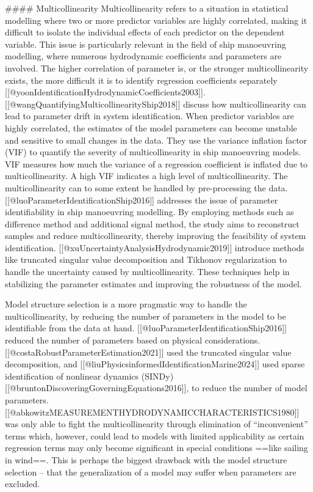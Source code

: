 #### Multicollinearity
Multicollinearity refers to a situation in statistical modelling where two or more predictor variables are highly correlated, making it difficult to isolate the individual effects of each predictor on the dependent variable. This issue is particularly relevant in the field of ship manoeuvring modelling, where numerous hydrodynamic coefficients and parameters are involved.
The higher correlation of parameter is, or the stronger multicollinearity exists, the more difficult it is to identify regression coefficients separately [[@yoonIdentificationHydrodynamicCoefficients2003]].
[[@wangQuantifyingMulticollinearityShip2018]] discuss how multicollinearity can lead to parameter drift in system identification. When predictor variables are highly correlated, the estimates of the model parameters can become unstable and sensitive to small changes in the data. They use the variance inflation factor (VIF) to quantify the severity of multicollinearity in ship manoeuvring models. VIF measures how much the variance of a regression coefficient is inflated due to multicollinearity. A high VIF indicates a high level of multicollinearity.
The multicollinearity can to some extent be handled by pre-processing the data.
[[@luoParameterIdentificationShip2016]] addresses the issue of parameter identifiability in ship manoeuvring modelling. By employing methods such as difference method and additional signal method, the study aims to reconstruct samples and reduce multicollinearity, thereby improving the feasibility of system identification.
[[@xuUncertaintyAnalysisHydrodynamic2019]] introduce methods like truncated singular value decomposition and Tikhonov regularization to handle the uncertainty caused by multicollinearity. These techniques help in stabilizing the parameter estimates and improving the robustness of the model.

Model structure selection is a more pragmatic way to handle the multicollinearity, by reducing the number of parameters in the model to be identifiable from the data at hand.  [[@luoParameterIdentificationShip2016]] reduced the number of parameters based on physical considerations. [[@costaRobustParameterEstimation2021]] used the truncated singular value decomposition, and [[@liuPhysicsinformedIdentificationMarine2024]] used sparse identification of nonlinear dynamics (SINDy) [[@bruntonDiscoveringGoverningEquations2016]], to reduce the number of model parameters. 
[[@abkowitzMEASUREMENTHYDRODYNAMICCHARACTERISTICS1980]] was only able to fight the multicollinearity through elimination of “inconvenient” terms which, however, could lead to models with limited applicability as certain regression terms may only become significant in special conditions ==like sailing in wind==. This is perhaps the biggest drawback with the model structure selection – that the generalization of a model may suffer when parameters are excluded.

